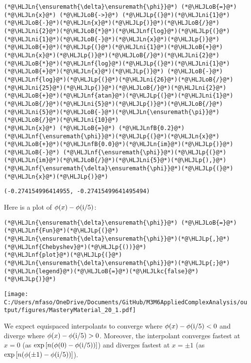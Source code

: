 \documentclass[12pt,a4paper]{article}
\newcommand{\HLJLkc}[1]{\textcolor[RGB]{59,151,46}{\textit{#1}}}
\newcommand{\HLJLn}[1]{#1}
\newcommand{\HLJLnf}[1]{\textcolor[RGB]{66,102,213}{#1}}
\newcommand{\HLJLnfB}[1]{\textcolor[RGB]{59,151,46}{#1}}
\newcommand{\HLJLni}[1]{\textcolor[RGB]{59,151,46}{#1}}
\newcommand{\HLJLoB}[1]{\textcolor[RGB]{102,102,102}{\textbf{#1}}}
\newcommand{\HLJLp}[1]{#1}
\def\I{ {\rm i} }
\begin{document}
\begin{lstlisting}
(*@\HLJLn{\ensuremath{\delta}\ensuremath{\phi}}@*) (*@\HLJLoB{=}@*) (*@\HLJLn{x}@*) (*@\HLJLoB{->}@*) (*@\HLJLp{(}@*)(*@\HLJLni{1}@*)(*@\HLJLoB{-}@*)(*@\HLJLn{x}@*)(*@\HLJLp{)}@*)(*@\HLJLoB{/}@*)(*@\HLJLni{2}@*)(*@\HLJLoB{*}@*)(*@\HLJLnf{log}@*)(*@\HLJLp{(}@*)(*@\HLJLni{1}@*)(*@\HLJLoB{-}@*)(*@\HLJLn{x}@*)(*@\HLJLp{)}@*)(*@\HLJLoB{+}@*)(*@\HLJLp{(}@*)(*@\HLJLni{1}@*)(*@\HLJLoB{+}@*)(*@\HLJLn{x}@*)(*@\HLJLp{)}@*)(*@\HLJLoB{/}@*)(*@\HLJLni{2}@*)(*@\HLJLoB{*}@*)(*@\HLJLnf{log}@*)(*@\HLJLp{(}@*)(*@\HLJLni{1}@*)(*@\HLJLoB{+}@*)(*@\HLJLn{x}@*)(*@\HLJLp{)}@*) (*@\HLJLoB{-}@*) (*@\HLJLnf{log}@*)(*@\HLJLp{(}@*)(*@\HLJLni{26}@*)(*@\HLJLoB{/}@*)(*@\HLJLni{25}@*)(*@\HLJLp{)}@*)(*@\HLJLoB{/}@*)(*@\HLJLni{2}@*)(*@\HLJLoB{+}@*)(*@\HLJLnf{atan}@*)(*@\HLJLp{(}@*)(*@\HLJLni{1}@*)(*@\HLJLoB{/}@*)(*@\HLJLni{5}@*)(*@\HLJLp{)}@*)(*@\HLJLoB{/}@*)(*@\HLJLni{5}@*)(*@\HLJLoB{-}@*)(*@\HLJLn{\ensuremath{\pi}}@*)(*@\HLJLoB{/}@*)(*@\HLJLni{10}@*)
(*@\HLJLn{x}@*) (*@\HLJLoB{=}@*) (*@\HLJLnfB{0.2}@*)
(*@\HLJLnf{\ensuremath{\phi}}@*)(*@\HLJLp{(}@*)(*@\HLJLn{x}@*)(*@\HLJLoB{+}@*)(*@\HLJLnfB{0.0}@*)(*@\HLJLn{im}@*)(*@\HLJLp{)}@*) (*@\HLJLoB{-}@*) (*@\HLJLnf{\ensuremath{\phi}}@*)(*@\HLJLp{(}@*)(*@\HLJLn{im}@*)(*@\HLJLoB{/}@*)(*@\HLJLni{5}@*)(*@\HLJLp{),}@*) (*@\HLJLnf{\ensuremath{\delta}\ensuremath{\phi}}@*)(*@\HLJLp{(}@*)(*@\HLJLn{x}@*)(*@\HLJLp{)}@*)
\end{lstlisting}

\begin{lstlisting}
(-0.274154996414955, -0.27415499641495494)
\end{lstlisting}


Here is a plot of $\phi(x) - \phi(\I/5)$:


\begin{lstlisting}
(*@\HLJLn{\ensuremath{\delta}\ensuremath{\phi}}@*) (*@\HLJLoB{=}@*) (*@\HLJLnf{Fun}@*)(*@\HLJLp{(}@*)(*@\HLJLn{\ensuremath{\delta}\ensuremath{\phi}}@*)(*@\HLJLp{,}@*)(*@\HLJLnf{Chebyshev}@*)(*@\HLJLp{())}@*)
(*@\HLJLnf{plot}@*)(*@\HLJLp{(}@*)(*@\HLJLn{\ensuremath{\delta}\ensuremath{\phi}}@*)(*@\HLJLp{;}@*)(*@\HLJLn{legend}@*)(*@\HLJLoB{=}@*)(*@\HLJLkc{false}@*)(*@\HLJLp{)}@*)
\end{lstlisting}

\texttt{[image: C:/Users/mfaso/OneDrive/Documents/GitHub/M3M6AppliedComplexAnalysis/output/figures/MasteryMaterial\_20\_1.pdf]}

We expect equispaced interpolants to converge where $\phi(x) - \phi(\I/5) < 0$ and diverge where $\phi(x) - \phi(\I/5) > 0$. Moreover, the interpolant converges fastest at $x=0$ (as $\exp\left[n(\phi(0) - \phi(\I/5)) \right]$) and diverges fastest at $x = \pm 1$ (as $\exp\left[n(\phi(\pm 1) - \phi(\I/5)) \right]$).
\end{document}
